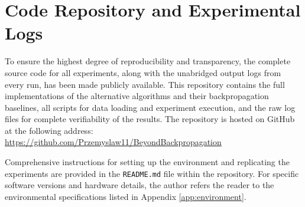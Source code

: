 \documentclass[11pt, english]{article}
\newcommand{\code}[1]{\texttt{#1}}
\begin{document}
\section{Code Repository and Experimental Logs}
\label{app:code_repository}
To ensure the highest degree of reproducibility and transparency, the complete source code for all experiments, along with the unabridged output logs from every run, has been made publicly available. This repository contains the full implementations of the alternative algorithms and their backpropagation baselines, all scripts for data loading and experiment execution, and the raw log files for complete verifiability of the results. The repository is hosted on GitHub at the following address: \url{https://github.com/Przemyslaw11/BeyondBackpropagation}

Comprehensive instructions for setting up the environment and replicating the experiments are provided in the \code{README.md} file within the repository. For specific software versions and hardware details, the author refers the reader to the environmental specifications listed in Appendix \ref{app:environment}.
\end{document}
